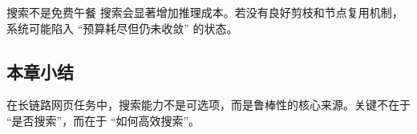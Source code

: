 \begin{warningbox}{搜索不是免费午餐}
搜索会显著增加推理成本。若没有良好剪枝和节点复用机制，系统可能陷入 ``预算耗尽但仍未收敛'' 的状态。
\end{warningbox}

\subsection{本章小结}
在长链路网页任务中，搜索能力不是可选项，而是鲁棒性的核心来源。关键不在于 ``是否搜索''，而在于 ``如何高效搜索''。

